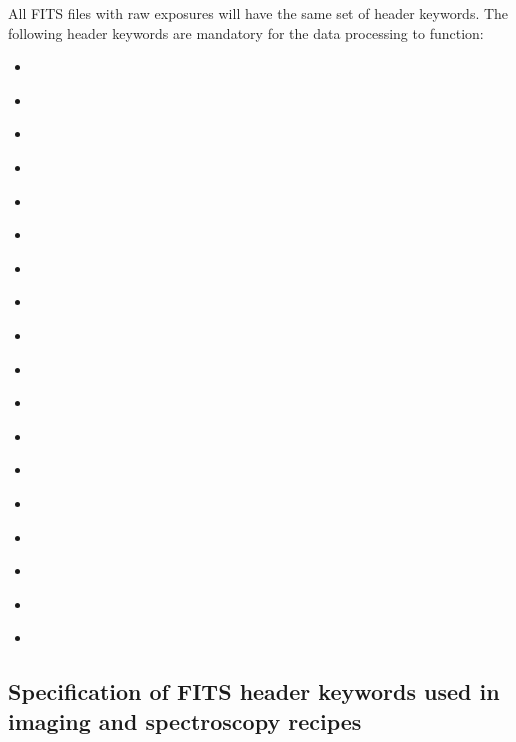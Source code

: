 All FITS files with raw exposures will have the same set of header keywords.
The following header keywords are mandatory for the data processing to function:
\begin{itemize}
    \setlength{\itemsep}{0pt}
        \item \hyperref[fits:cdeltn]{}
    \item \hyperref[fits:crpixn]{}
    \item \hyperref[fits:crvaln]{}
    \item \hyperref[fits:ctypen]{}
    \item \hyperref[fits:cunitn]{}
    \item \hyperref[fits:det.dit]{}
    \item \hyperref[fits:det.readout]{}
    \item \hyperref[fits:dpr.catg]{}
    \item \hyperref[fits:dpr.tech]{}
    \item \hyperref[fits:dpr.type]{}
    \item \hyperref[fits:exptime]{}
    \item \hyperref[fits:ins.filt.name]{}
    \item \hyperref[fits:instrume]{}
    \item \hyperref[fits:mjd-obs]{}
    \item \hyperref[fits:obs.tplno]{}
    \item \hyperref[fits:ocs.pxscale]{}
    \item \hyperref[fits:tpl.expno]{}
    \item \hyperref[fits:tpl.start]{}

\end{itemize}




\subsection{Specification of FITS header keywords used in imaging and spectroscopy recipes}{}\label{sec:allheaderkeywords}

